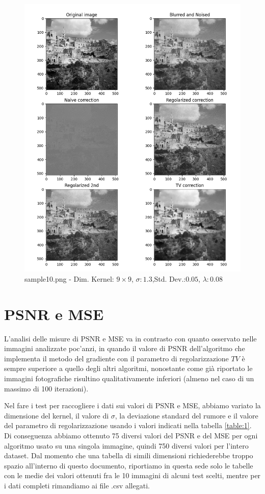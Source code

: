 \documentclass[12pt]{article}
\begin{document}
    \begin{figure}[h!]
    \includegraphics[width=14cm]{sample10}
    \caption{sample10.png - Dim. Kernel: $9\times9$, $\sigma:1.3$,Std. Dev.:$0.05$, $\lambda:0.08$}
    \end{figure}
    \newpage

\section{PSNR e MSE}
    L'analisi delle misure di PSNR e MSE va in contrasto con quanto osservato nelle immagini analizzate poc'anzi, in quando il valore di PSNR dell'algoritmo che implementa il metodo del gradiente con il parametro di regolarizzazione $TV$ è sempre superiore a quello degli altri algoritmi, nonostante come già riportato le immagini fotografiche risultino qualitativamente inferiori (almeno nel caso di un massimo di 100 iterazioni).
    
    Nel fare i test per raccogliere i dati sui valori di PSNR e MSE, abbiamo variato la dimensione del kernel, il valore di $\sigma$, la deviazione standard del rumore e il valore del parametro di regolarizzazione usando i valori indicati nella tabella \ref{table:1}. Di conseguenza abbiamo ottenuto 75 diversi valori del PSNR e del MSE per ogni algoritmo usato su una singola immagine, quindi 750 diversi valori per l'intero dataset. Dal momento che una tabella di simili dimensioni richiederebbe troppo spazio all'interno di questo documento, riportiamo in questa sede solo le tabelle con le medie dei valori ottenuti fra le 10 immagini di alcuni test scelti, mentre per i dati completi rimandiamo ai file .csv allegati.
    
\end{document}
